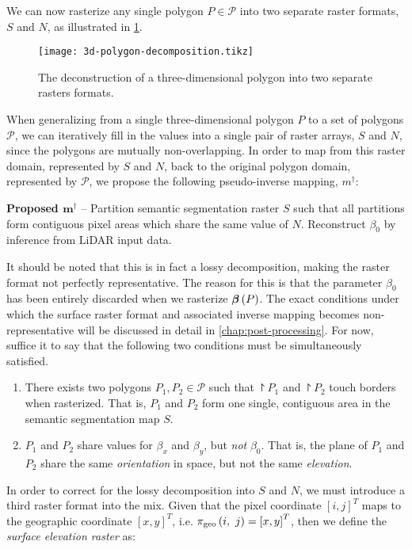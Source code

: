 We can now rasterize any single polygon $P \in \mathcal{P}$ into two separate raster formats, $S$ and $N$, as illustrated in \cref{fig:3d-polygon-decomposition}.
\begin{figure}
  \centering
  \texttt{[image: 3d-polygon-decomposition.tikz]}
  \caption{The deconstruction of a three-dimensional polygon into two separate rasters formats.}
  \label{fig:3d-polygon-decomposition}
\end{figure}
When generalizing from a single three-dimensional polygon $P$ to a set of polygons $\mathcal{P}$, we can iteratively fill in the values into a single pair of raster arrays, $S$ and $N$, since the polygons are mutually non-overlapping.
In order to map from this raster domain, represented by $S$ and $N$, back to the original polygon domain, represented by $\mathcal{P}$, we propose the following pseudo-inverse mapping, $m^{\dagger}$:
\begin{framed}
  \noindent
  \textbf{Proposed $\mathbf{m^{\dagger}}$} -- Partition semantic segmentation raster $S$ such that all partitions form contiguous pixel areas which share the same value of $N$.
  Reconstruct $\beta_0$ by inference from LiDAR input data.
\end{framed}
\noindent
It should be noted that this is in fact a lossy decomposition, making the raster format not perfectly representative.
The reason for this is that the parameter $\beta_0$ has been entirely discarded when we rasterize $\boldsymbol{\beta}\left(P\right)$.
The exact conditions under which the surface raster format and associated inverse mapping becomes non-representative will be discussed in detail in \cref{chap:post-processing}.
For now, suffice it to say that the following two conditions must be simultaneously satisfied.
\begin{enumerate}
  \item There exists two polygons $P_1, P_2 \in \mathcal{P}$ such that $\project{P_1}$ and $\project{P_2}$ touch borders when rasterized.
    That is, $P_1$ and $P_2$ form one single, contiguous area in the semantic segmentation map $S$.
  \item $P_1$ and $P_2$ share values for $\beta_x$ and $\beta_y$, but \emph{not} $\beta_0$.
    That is, the plane of $P_1$ and $P_2$ share the same \textit{orientation} in space, but not the same \textit{elevation}.
\end{enumerate}
In order to correct for the lossy decomposition into $S$ and $N$, we must introduce a third raster format into the mix.
Given that the pixel coordinate ${[i, j]}^T$ maps to the geographic coordinate $[x, y]^T$, i.e. $\pi_{\mathrm{geo}}\left(i,~j\right) = {[x, y]}^T$, then we define the \textit{surface elevation raster} as:
